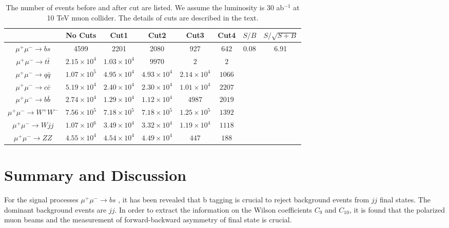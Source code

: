 \documentclass[a4paper,11pt]{article}
\begin{document}
\begin{center}
\begin{table}
  \begin{center}
  \begin{tabular}{c|c|c|c|c|c|c|c}
  \hline
  &  No Cuts  & Cut1  &    Cut2 & Cut3 & Cut4 & $S/B$ &  $S/\sqrt{S+B}$  \\
  \hline
  $\mu^+\mu^-\to bs$     &   4599  &  2201   &   2080  &  927 & 642   &   \multirow{8}{*}{0.08}   &  \multirow{8}{*}{6.91}  \\
  $\mu^+\mu^-\to t\bar{t}$     &   $2.15\times{10^4}$  &  $1.03\times{10^4}$  & $9970$   &  $2$  & $2$  & & \\
  $\mu^+\mu^-\to q\bar{q}$     &   $1.07\times{10^5}$  &   $4.95\times{10^4}$    &   $4.93\times{10^4}$ & $2.14\times{10^4}$    &  $1066$ &   &  \\
  $\mu^+\mu^-\to c\bar{c}$     &   $5.19\times{10^4}$  &  $2.40\times{10^4}$    &    $2.30\times{10^4}$ & $1.01\times{10^4}$    &  $2207$  &   &  \\
  $\mu^+\mu^-\to b\bar{b}$     &   $2.74\times{10^4}$   &  $1.29\times{10^4}$   &  $1.12\times{10^4}$ &   $4987$    &  $2019$  &   &  \\
  $\mu^+\mu^-\to W^+W^-$  & $7.56\times{10^5}$   & $7.18\times{10^5}$  &  $7.18\times{10^5}$ &  $1.25\times{10^5}$ &  $1392$ & & \\
  $\mu^+\mu^-\to Wjj$  & $1.07\times{10^6}$  & $3.49\times{10^4}$ & $3.32\times{10^4}$  &  $1.19\times{10^4}$   &  $1118$  & & \\
  $\mu^+\mu^-\to ZZ$  & $4.55\times{10^4}$  & $4.54\times{10^4}$ & $4.49\times{10^4}$ &  $447$   &  $188$  &  & \\
  \hline
  \end{tabular}
  \end{center}
  \caption{The number of events before and after cut are listed. We assume the luminosity is $30$ ab$^{-1}$ at 10 TeV muon collider. The details of cuts are described in the text.\label{table:bs:cut}}
\end{table}
\end{center}



\section{Summary and Discussion}\label{Sec:conc}
For the signal processes $\mu^+ \mu^- \to b s$ \cite{Altmannshofer:2022xri}, it has been revealed that b tagging is crucial to reject background events from $jj$ final states. The dominant background events are $j j$. In order to extract the information on the Wilson coefficients $C_{9}$ and $C_{10}$, it is found that the polarized muon beams and the measurement of forward-backward asymmetry of final state is crucial. 
\end{document}
